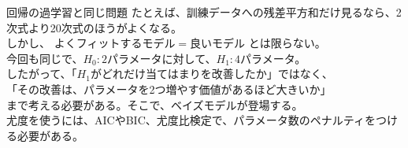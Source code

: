 \documentclass[dvipdfmx, 11pt, aspectratio=169, notheorems]{beamer}
\begin{document}
\begin{frame}{回帰の過学習と同じ問題}
    たとえば、訓練データへの残差平方和だけ見るなら、2次式より20次式のほうがよくなる。\\
    しかし、\; よくフィットするモデル$=$良いモデル \;とは限らない。\\
    \vspace{12pt}
    今回も同じで、$H_0:2$パラメータに対して、$H_1:4$パラメータ。\\
    したがって、「$H_1$がどれだけ当てはまりを改善したか」ではなく、\\
    「\alert{その改善は、パラメータを2つ増やす価値があるほど大きいか}」\\
    まで考える必要がある。そこで、ベイズモデルが登場する。\\
    {\scriptsize 尤度を使うには、AICやBIC、尤度比検定で、パラメータ数のペナルティをつける必要がある。}
\end{frame}














\end{document}
